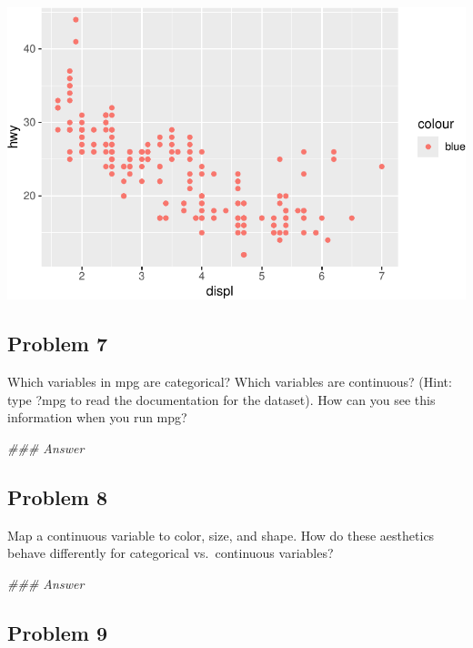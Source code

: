 \documentclass[
  letterpaper,
  DIV=11,
  numbers=noendperiod]{scrreprt}
\newenvironment{Shaded}{\begin{snugshade}}{\end{snugshade}}
\newcommand{\DocumentationTok}[1]{\textcolor[rgb]{0.37,0.37,0.37}{\textit{#1}}}
\begin{document}
\includegraphics{Beginning_Data_Visualization_files/figure-pdf/Ex6-1.pdf}

\subsection*{Problem 7}\label{problem-7-1}

Which variables in mpg are categorical? Which variables are continuous?
(Hint: type ?mpg to read the documentation for the dataset). How can you
see this information when you run mpg?

\begin{Shaded}
\begin{Highlighting}[]
\DocumentationTok{\#\#\# Answer}
\end{Highlighting}
\end{Shaded}

\subsection*{Problem 8}\label{problem-8-1}

Map a continuous variable to color, size, and shape. How do these
aesthetics behave differently for categorical vs.~continuous variables?

\begin{Shaded}
\begin{Highlighting}[]
\DocumentationTok{\#\#\# Answer}
\end{Highlighting}
\end{Shaded}

\subsection*{Problem 9}\label{problem-9-1}
\end{document}
